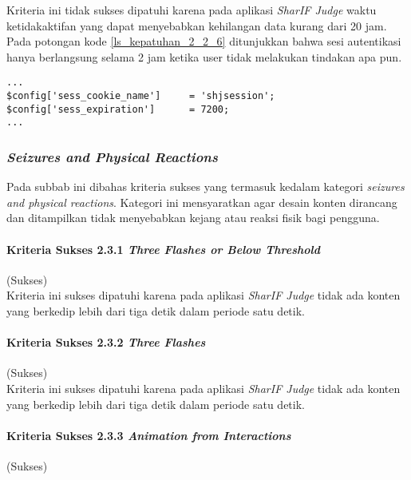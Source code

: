 Kriteria ini tidak sukses dipatuhi karena pada aplikasi \textit{SharIF Judge} waktu ketidakaktifan yang dapat menyebabkan kehilangan data kurang dari 20 jam. Pada potongan kode \ref{ls_kepatuhan_2_2_6} ditunjukkan bahwa sesi autentikasi hanya berlangsung selama 2 jam ketika user tidak melakukan tindakan apa pun.
\begin{lstlisting}[basicstyle=\ttfamily, frame=single,
columns=fullflexible, keepspaces=true, breaklines=true, label=ls_kepatuhan_2_2_6, caption=Pelanggaran Kriteria Sukses 2.2.6 - Sesi Autentikasi]
...
$config['sess_cookie_name']		= 'shjsession';
$config['sess_expiration']		= 7200;
...
\end{lstlisting}

\subsubsection{\textit{Seizures and Physical Reactions}}
\label{subsubsec:seizures_and_physical_reactions}

Pada subbab ini dibahas kriteria sukses yang termasuk kedalam kategori \textit{seizures and physical reactions}. Kategori ini mensyaratkan agar desain konten dirancang dan ditampilkan tidak menyebabkan kejang atau reaksi fisik bagi pengguna.

\paragraph{Kriteria Sukses 2.3.1 \textit{Three Flashes or Below Threshold}}
\label{subsubsec:kepatuhan_kriteria_2.3.1}
(Sukses)\\

Kriteria ini sukses dipatuhi karena pada aplikasi \textit{SharIF Judge} tidak ada konten yang berkedip lebih dari tiga detik dalam periode satu detik.

\paragraph{Kriteria Sukses 2.3.2 \textit{Three Flashes}}
\label{subsubsec:kepatuhan_kriteria_2.3.2}
(Sukses) \\

Kriteria ini sukses dipatuhi karena pada aplikasi \textit{SharIF Judge} tidak ada konten yang berkedip lebih dari tiga detik dalam periode satu detik.

\paragraph{Kriteria Sukses 2.3.3 \textit{Animation from Interactions}}
\label{subsubsec:kepatuhan_kriteria_2.3.3}
(Sukses) \\

